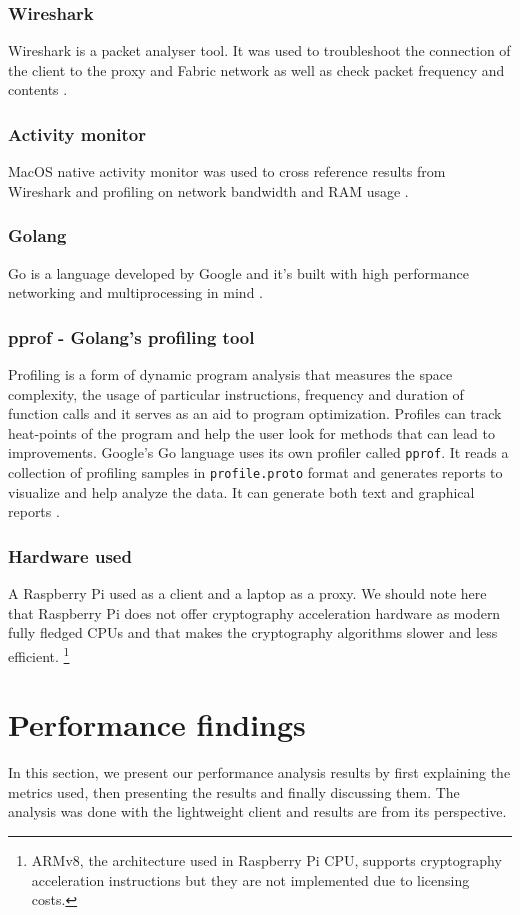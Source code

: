 \subsubsection{Wireshark}
Wireshark is a packet analyser tool. It was used to troubleshoot the connection of the client to the proxy and Fabric network as well as check packet frequency and contents \cite{wireshark}.
\subsubsection{Activity monitor}
MacOS native activity monitor was used to cross reference results from Wireshark and profiling on network bandwidth and RAM usage \cite{instruments}.
\subsubsection{Golang}
Go is a language developed by Google and it's built with high performance networking and multiprocessing in mind \cite{golang}.
\subsubsection{pprof - Golang's profiling tool}
Profiling is a form of dynamic program analysis that measures the space complexity, the usage of particular instructions, frequency and duration of function calls and it serves as an aid to program optimization. Profiles can track heat-points of the program and help the user look for methods that can lead to improvements.
Google's Go language uses its own profiler called \verb|pprof|. It reads a collection of profiling samples in \verb|profile.proto| format and generates reports to visualize and help analyze the data. It can generate both text and graphical reports \cite{pprof}.
\subsubsection{Hardware used}
A Raspberry Pi used as a client and a laptop as a proxy. We should note here that Raspberry Pi does not offer cryptography acceleration hardware as modern fully fledged CPUs and that makes the cryptography algorithms slower and less efficient. \footnote{ARMv8, the architecture used in Raspberry Pi CPU, supports cryptography acceleration instructions but they are not implemented due to licensing costs.}

\section{Performance findings}
In this section, we present our performance analysis results by first explaining the metrics used, then presenting the results and finally discussing them. The analysis was done with the lightweight client and results are from its perspective.


